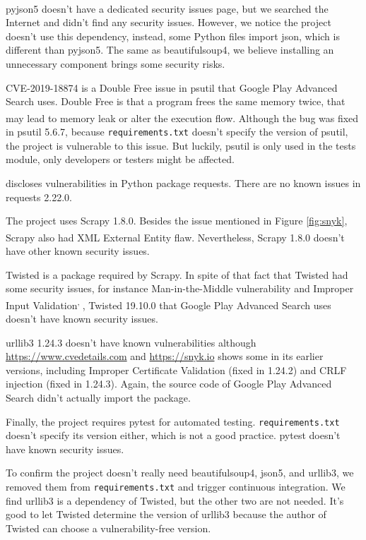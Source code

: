 \documentclass[12pt, a4paper]{article}
\newcommand{\code}[1]{\texttt{#1}}
\begin{document}
pyjson5\textsuperscript{\cite{pyjson5}} doesn't have a dedicated security issues page, but we searched the Internet and didn't find any security issues. However, we notice the project doesn't use this dependency, instead, some Python files import json, which is different than pyjson5. The same as beautifulsoup4, we believe installing an unnecessary component brings some security risks.

CVE-2019-18874 is a Double Free issue in psutil that Google Play Advanced Search uses. Double Free is that a program frees the same memory twice, that may lead to memory leak or alter the execution flow.\textsuperscript{\cite{double-free}} Although the bug was fixed in psutil 5.6.7, because \code{requirements.txt} doesn't specify the version of psutil, the project is vulnerable to this issue. But luckily, psutil is only used in the tests module, only developers or testers might be affected.

\cite{requests-security-vulnerabilities} discloses vulnerabilities in Python package requests. There are no known issues in requests 2.22.0.

The project uses Scrapy 1.8.0. Besides the issue mentioned in Figure \ref{fig:snyk}, Scrapy also had XML External Entity flaw.\textsuperscript{\cite{scrapy-xml}} Nevertheless, Scrapy 1.8.0 doesn't have other known security issues.

Twisted is a package required by Scrapy. In spite of that fact that Twisted had some security issues, for instance Man-in-the-Middle vulnerability and Improper Input Validation\textsuperscript{\cite{cve-twisted}, \cite{snyk-twisted}}, Twisted 19.10.0 that Google Play Advanced Search uses doesn't have known security issues.

urllib3 1.24.3 doesn't have known vulnerabilities although \url{https://www.cvedetails.com} and \url{https://snyk.io} shows some in its earlier versions, including Improper Certificate Validation (fixed in 1.24.2) and CRLF injection (fixed in 1.24.3). Again, the source code of Google Play Advanced Search didn't actually import the package.

Finally, the project requires pytest for automated testing. \code{requirements.\linebreak[0]txt} doesn't specify its version either, which is not a good practice. pytest doesn't have known security issues.


To confirm the project doesn't really need beautifulsoup4, json5, and urllib3, we removed them from \code{requirements.\linebreak[0]txt} and trigger continuous integration. We find urllib3 is a dependency of Twisted, but the other two are not needed. It's good to let Twisted determine the version of urllib3 because the author of Twisted can choose a vulnerability-free version.
\end{document}
